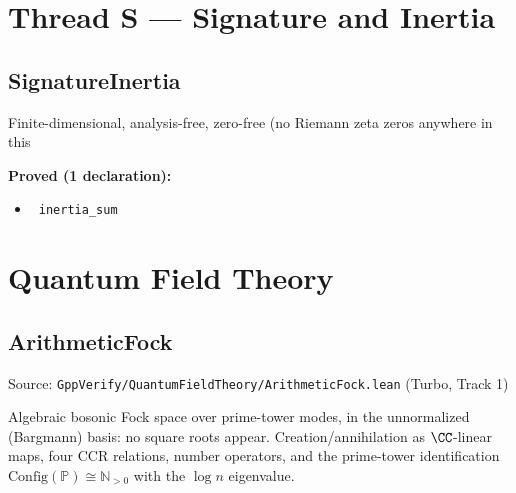\documentclass{report}
\theoremstyle{definition}
\begin{document}
\begin{itemize}
\begin{itemize}
\section{Thread S --- Signature and Inertia}

\subsection{SignatureInertia}
Finite-dimensional, analysis-free, zero-free (no Riemann zeta zeros anywhere in this

\noindent\textbf{Proved (1 declaration):}
\begin{itemize}
  \item {}\leanok\ \texttt{inertia\_sum}
\end{itemize}

\section{Quantum Field Theory}

\subsection{ArithmeticFock}
Source: \texttt{GppVerify/QuantumFieldTheory/ArithmeticFock.lean} (Turbo, Track 1)

Algebraic bosonic Fock space over prime-tower modes, in the unnormalized
(Bargmann) basis: no square roots appear. Creation/annihilation as
$\CC$-linear maps, four CCR relations, number operators, and the
prime-tower identification $\mathrm{Config}(\mathbb{P}) \cong \mathbb{N}_{>0}$
with the $\log n$ eigenvalue.


\end{itemize}
\end{itemize}
\end{document}
